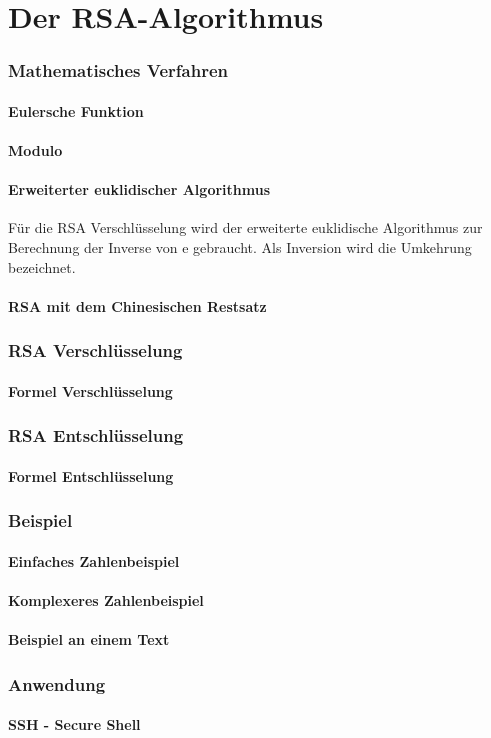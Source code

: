 \part{Der RSA-Algorithmus}
\section{Mathematisches Verfahren}
\subsection{Eulersche Funktion}
\subsection{Modulo}
\subsection{Erweiterter euklidischer Algorithmus}
Für die RSA Verschlüsselung wird der erweiterte euklidische Algorithmus zur Berechnung der Inverse von e gebraucht. Als Inversion wird die Umkehrung bezeichnet. 
\subsection{RSA mit dem Chinesischen Restsatz}


\section{RSA Verschlüsselung}
\subsection{Formel Verschlüsselung}
\section{RSA Entschlüsselung}
\subsection{Formel Entschlüsselung}
\section{Beispiel}
\subsection{Einfaches Zahlenbeispiel}
\subsection{Komplexeres Zahlenbeispiel}
\subsection{Beispiel an einem Text}
\section{Anwendung}
\subsection{SSH - Secure Shell}
